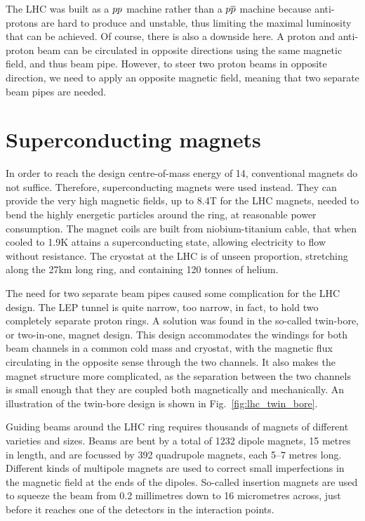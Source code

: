 The LHC was built as a ${p}{p}$ machine rather than a ${p}{\overline{p}}$ machine because anti-protons are
hard to produce and unstable, thus limiting the maximal luminosity that can be achieved. Of course,
there is also a downside here. A proton and anti-proton beam can be circulated in opposite
directions using the same magnetic field, and thus beam pipe. However, to steer two proton beams in
opposite direction, we need to apply an opposite magnetic field, meaning that two separate beam
pipes are needed. 


\section{Superconducting magnets}

In order to reach the design centre-of-mass energy of 14\TeV, conventional magnets do not
suffice. Therefore, superconducting magnets were used instead. They can provide the very high
magnetic fields, up to 8.4\unit{T} for the LHC magnets, needed to bend the highly energetic
particles around the ring, at reasonable power consumption. The magnet coils are built from
niobium-titanium
cable, that when cooled to 1.9\unit{K} attains a superconducting state, allowing electricity to flow
without resistance. The cryostat at the LHC is of unseen proportion, stretching along the
27\unit{km} long ring, and containing 120 tonnes of helium.

The need for two separate beam pipes caused some complication for the LHC design. The LEP tunnel is
quite narrow, too narrow, in fact, to hold two completely separate proton rings. A solution was
found in the so-called twin-bore, or two-in-one, magnet design. This design accommodates the
windings for both beam channels in a common cold mass and cryostat, with the magnetic flux
circulating in the opposite sense through the two channels. 
It also makes the magnet structure more complicated, as the separation between the two channels is
small enough that they are coupled both magnetically and mechanically. An illustration of the
twin-bore design is shown in Fig.~\ref{fig:lhc_twin_bore}. 

Guiding beams around the LHC ring requires thousands of magnets of different varieties and sizes.
Beams are bent by a total of 1232 dipole magnets, 15 metres in length, and are focussed by 392
quadrupole magnets, each 5–7 metres long. Different kinds of multipole magnets are used to correct
small imperfections in the magnetic field at the ends of the dipoles. So-called insertion magnets
are used to squeeze the beam from 0.2 millimetres down to 16 micrometres across, just before it
reaches one of the detectors in the interaction points. 

